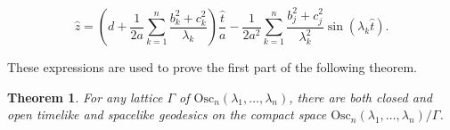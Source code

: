 \documentclass[12pt]{amsart}
\theoremstyle{plain}
\newtheorem{thm}{Theorem}[section]
\theoremstyle{definition}
\theoremstyle{remark}
\begin{document}
\begin{equation}\label{oscilador_geos_2}
    \hat{z} = \left(d + \frac{1}{2 a} \sum_{k=1}^{n} \frac{b_k^2 + c_k^2}{\lambda_k}\right) \frac{\hat{t}}{a} - \frac{1}{2 a^2} \sum_{k=1}^{n} \frac{b_j^2 + c_j^2}{\lambda_k^2} \sin(\lambda_k \hat{t}).
\end{equation}

These expressions are used to prove the first part of the following theorem.

\begin{thm}\label{othergeodesics}
    For any lattice \( \Gamma \) of \( \text{Osc}_n(\lambda_1, \ldots, \lambda_n) \), there are both closed and open timelike and spacelike geodesics on the compact space \( \text{Osc}_n(\lambda_1, \ldots, \lambda_n) / \Gamma \).
\end{thm}
\end{document}
